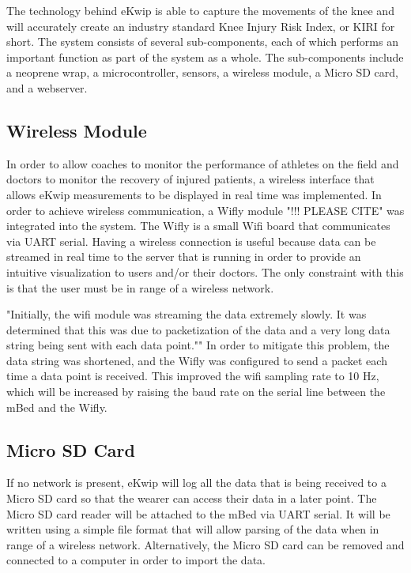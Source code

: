 The technology behind eKwip is able to capture the movements of the knee and will accurately create an industry standard Knee Injury Risk Index, or KIRI for short. The system consists of several sub-components, each of which performs an important function as part of the system as a whole. The sub-components include a neoprene wrap, a microcontroller, sensors, a wireless module, a Micro SD card, and a webserver.

\subsection {Wireless Module}
In order to allow coaches to monitor the performance of athletes on the field and doctors to monitor the recovery of injured patients, a wireless interface that allows eKwip measurements to be displayed in real time was implemented. In order to achieve wireless communication, a Wifly module "!!! PLEASE CITE" was integrated into the system. The Wifly is a small Wifi board that communicates via UART serial. Having a wireless connection is useful because data can be streamed in real time to the server that is running in order to provide an intuitive visualization to users and/or their doctors. The only constraint with this is that the user must be in range of a wireless network.

"Initially, the wifi module was streaming the data extremely slowly. It was determined that this was due to packetization of the data and a very long data string being sent with each data point."" In order to mitigate this problem, the data string was shortened, and the Wifly was configured to send a packet each time a data point is received. This improved the wifi sampling rate to 10 Hz, which will be increased by raising the baud rate on the serial line between the mBed and the Wifly.

\subsection {Micro SD Card}
If no network is present, eKwip will log all the data that is being received to a Micro SD card so that the wearer can access their data in a later point. The Micro SD card reader will be attached to the mBed via UART serial. It will be written using a simple file format that will allow parsing of the data when in range of a wireless network. Alternatively, the Micro SD card can be removed and connected to a computer in order to import the data.

